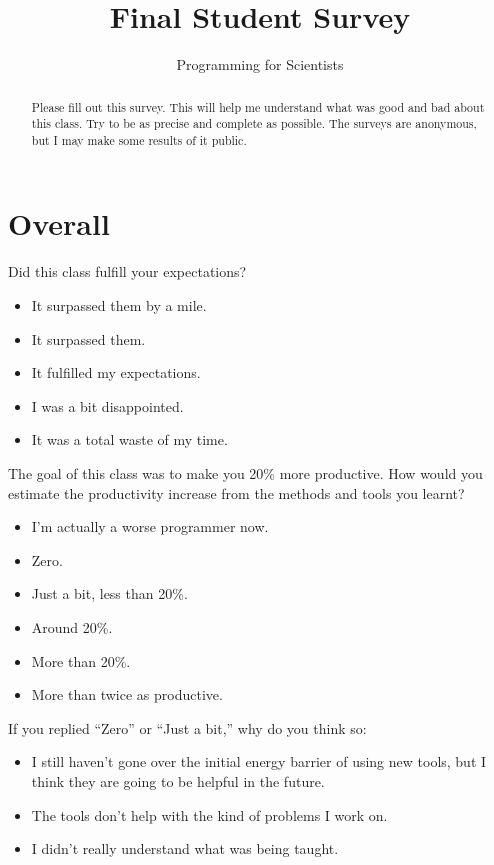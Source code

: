 \documentclass[article,twoside]{memoir}
\title{Final Student Survey}
\author{Programming for Scientists}
\newcommand*{\checkbox}{$\square$}
\begin{document}
\maketitle
\begin{abstract}
Please fill out this survey. This will help me understand what was good and bad about this class. Try to be as precise and complete as possible. The surveys are anonymous, but I may make some results of it public.
\end{abstract}
\vspace{-2em}
\chapter{Overall}
Did this class fulfill your expectations?
\begin{itemize}[\checkbox]
\item It surpassed them by a mile.
\item It surpassed them.
\item It fulfilled my expectations.
\item I was a bit disappointed.
\item It was a total waste of my time.
\end{itemize}

The goal of this class was to make you 20\% more productive. How would you estimate the productivity increase from the methods and tools you learnt?
\begin{itemize}[\checkbox]
\item I'm actually a worse programmer now.
\item Zero.
\item Just a bit, less than 20\%.
\item Around 20\%.
\item More than 20\%.
\item More than twice as productive.
\end{itemize}

If you replied ``Zero'' or ``Just a bit,'' why do you think so:

\begin{itemize}[\checkbox]
\item I still haven't gone over the initial energy barrier of using new tools, but I think they are going to be helpful in the future.
\item The tools don't help with the kind of problems I work on.
\item I didn't really understand what was being taught.
\end{itemize}
\end{document}
